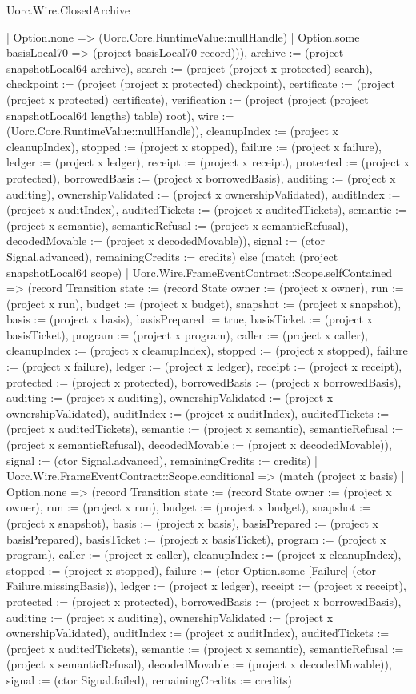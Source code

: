 \begin{lexlean}{Uorc.Wire.ClosedArchive}
\begin{semanticmodule}
{{{{        | Option.none => (Uorc.Core.RuntimeValue::nullHandle)
        | Option.some basisLocal70 => (project basisLocal70 record))), archive := (project snapshotLocal64 archive), search := (project (project x protected) search), checkpoint := (project (project x protected) checkpoint), certificate := (project (project x protected) certificate), verification := (project (project (project snapshotLocal64 lengths) table) root), wire := (Uorc.Core.RuntimeValue::nullHandle)}), cleanupIndex := (project x cleanupIndex), stopped := (project x stopped), failure := (project x failure), ledger := (project x ledger), receipt := (project x receipt), protected := (project x protected), borrowedBasis := (project x borrowedBasis), auditing := (project x auditing), ownershipValidated := (project x ownershipValidated), auditIndex := (project x auditIndex), auditedTickets := (project x auditedTickets), semantic := (project x semantic), semanticRefusal := (project x semanticRefusal), decodedMovable := (project x decodedMovable)}), signal := (ctor Signal.advanced), remainingCredits := credits}) else (match (project snapshotLocal64 scope)
        | Uorc.Wire.FrameEventContract::Scope.selfContained => (record Transition {state := (record State {owner := (project x owner), run := (project x run), budget := (project x budget), snapshot := (project x snapshot), basis := (project x basis), basisPrepared := true, basisTicket := (project x basisTicket), program := (project x program), caller := (project x caller), cleanupIndex := (project x cleanupIndex), stopped := (project x stopped), failure := (project x failure), ledger := (project x ledger), receipt := (project x receipt), protected := (project x protected), borrowedBasis := (project x borrowedBasis), auditing := (project x auditing), ownershipValidated := (project x ownershipValidated), auditIndex := (project x auditIndex), auditedTickets := (project x auditedTickets), semantic := (project x semantic), semanticRefusal := (project x semanticRefusal), decodedMovable := (project x decodedMovable)}), signal := (ctor Signal.advanced), remainingCredits := credits})
        | Uorc.Wire.FrameEventContract::Scope.conditional => (match (project x basis)
          | Option.none => (record Transition {state := (record State {owner := (project x owner), run := (project x run), budget := (project x budget), snapshot := (project x snapshot), basis := (project x basis), basisPrepared := (project x basisPrepared), basisTicket := (project x basisTicket), program := (project x program), caller := (project x caller), cleanupIndex := (project x cleanupIndex), stopped := (project x stopped), failure := (ctor Option.some [Failure] (ctor Failure.missingBasis)), ledger := (project x ledger), receipt := (project x receipt), protected := (project x protected), borrowedBasis := (project x borrowedBasis), auditing := (project x auditing), ownershipValidated := (project x ownershipValidated), auditIndex := (project x auditIndex), auditedTickets := (project x auditedTickets), semantic := (project x semantic), semanticRefusal := (project x semanticRefusal), decodedMovable := (project x decodedMovable)}), signal := (ctor Signal.failed), remainingCredits := credits})
}
\end{semanticmodule}
\end{lexlean}
